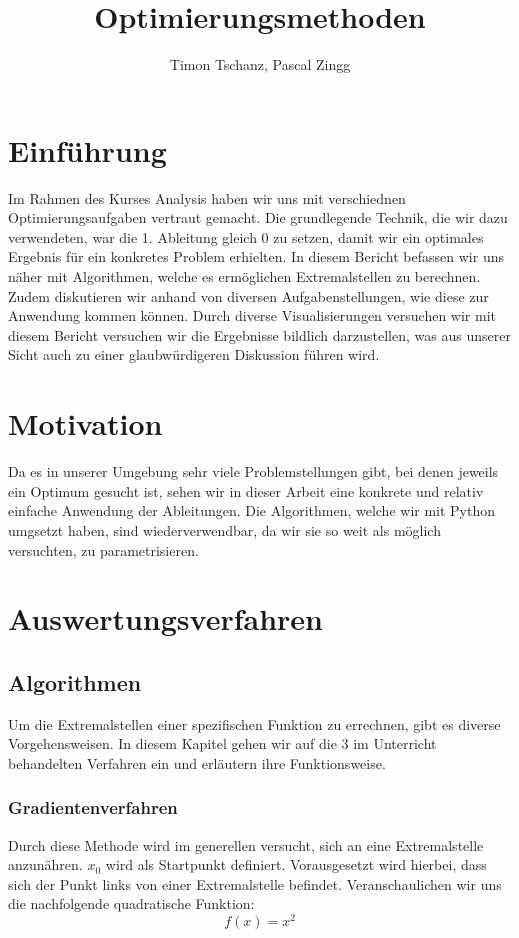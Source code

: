 \documentclass[10pt]{article}         %
\title{Optimierungsmethoden}
\author{Timon Tschanz, Pascal Zingg}
\begin{document}
\maketitle

\section{Einführung}
Im Rahmen des Kurses Analysis haben wir uns mit verschiednen Optimierungsaufgaben vertraut gemacht. Die grundlegende Technik, die wir dazu verwendeten, war die 1. Ableitung gleich 0 zu setzen, damit wir ein optimales Ergebnis für ein konkretes Problem erhielten. In diesem Bericht befassen wir uns näher mit Algorithmen, welche es ermöglichen Extremalstellen zu berechnen. Zudem diskutieren wir anhand von diversen Aufgabenstellungen, wie diese zur Anwendung kommen können. Durch diverse Visualisierungen versuchen wir mit diesem Bericht versuchen wir die Ergebnisse bildlich darzustellen, was aus unserer Sicht auch zu einer glaubwürdigeren Diskussion führen wird.

\section{Motivation}
Da es in unserer Umgebung sehr viele Problemstellungen gibt, bei denen jeweils ein Optimum gesucht ist, sehen wir in dieser Arbeit eine konkrete und relativ einfache Anwendung der Ableitungen. Die Algorithmen, welche wir mit Python umgsetzt haben, sind wiederverwendbar, da wir sie so weit als möglich versuchten, zu parametrisieren. 

\pagebreak
\section{Auswertungsverfahren}
\subsection{Algorithmen}
Um die Extremalstellen einer spezifischen Funktion zu errechnen, gibt es diverse Vorgehensweisen. In diesem Kapitel gehen wir auf die 3 im Unterricht behandelten Verfahren ein und erläutern ihre Funktionsweise. 

\subsubsection{Gradientenverfahren}
Durch diese Methode wird im generellen versucht, sich an eine Extremalstelle anzunähren. $x_0$ wird als Startpunkt definiert. Vorausgesetzt wird hierbei, dass sich der Punkt links von einer Extremalstelle befindet. Veranschaulichen wir uns die nachfolgende quadratische Funktion:
\[
    f(x)=x^2
\]
\end{document}

